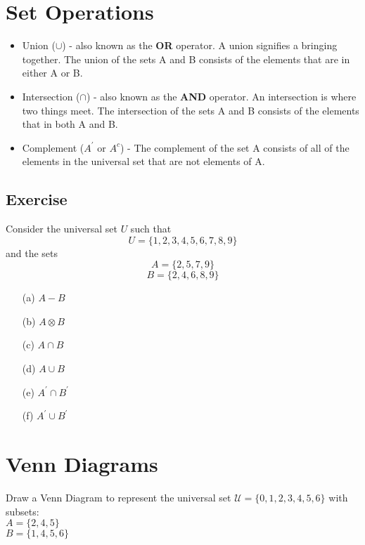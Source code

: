 {{{%
\newpage
\section*{Set Operations}
\begin{itemize}
	\item Union ($\cup$) - also known as the \textbf{OR} operator. A union signifies a bringing together. The union of the sets A and B consists of the elements that are in either A or B.
	\item Intersection ($\cap$) - also known as the \textbf{AND} operator. An intersection is where two things meet. The intersection of the sets A and B consists of the elements that in both A and B.
	\item Complement ($A^{\prime}$ or $A^{c}$) - The complement of the set A consists of all of the elements in the universal set that are not elements of A.
\end{itemize}

\subsection*{Exercise}
Consider the universal set $U$ such that
\[U=\{1,2,3,4,5,6,7,8,9\} \] 
and the sets
\[A=\{2,5,7,9\} \] 
\[B=\{2,4,6,8,9\} \]

\begin{multicols}{2}
\begin{itemize}
	\item[(a)] $A-B$
	\item[(b)] $A \otimes B$
	\item[(c)] $A \cap B$
	\item[(d)] $A \cup B$
	\item[(e)] $A^{\prime} \cap B^{\prime}$
	\item[(f)] $A^{\prime} \cup B^{\prime}$
\end{itemize}
\end{multicols}

\newpage

\section*{Venn Diagrams}

Draw a Venn Diagram to represent the universal set
$\mathcal{U} = \{0,1,2,3,4,5,6\}$ with subsets:\\
$A = \{2,4,5\}$\\
$B = \{1,4,5,6\}$\\

}}}
